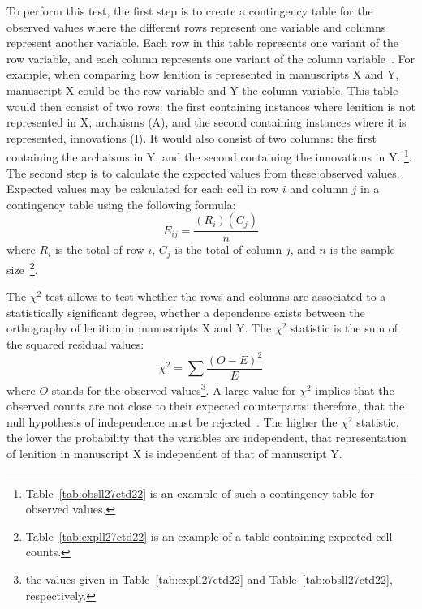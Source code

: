 To perform this test, the  first step is to create a contingency table for the observed values where the different rows represent one variable and columns represent another variable. Each row in this table represents one variant of the row variable, and each column represents one variant of the column variable~\autocite[754]{MS_Statistics09}.
For example, when comparing how lenition is represented in manuscripts X and Y, manuscript X could be the row variable and Y the column variable. This table would then consist of two rows: the first containing instances where lenition is not represented in X, \ie archaisms (A), and the second containing  instances where it is represented, \ie innovations (I).  It would also consist of two columns: the first containing the archaisms in Y, and the second containing the innovations in Y.
\footnote{Table~\ref{tab:obsll27ctd22} is an example of such a contingency table for observed values.}.
The second step is to calculate the expected values from these observed values. Expected values may be calculated for each cell in row \(i\) and column \(j\) in a contingency table using the following formula:
\[E_{ij}=\frac{(R_i)(C_j)}{n}\]
where \(R_i\) is the total of row \(i\), \(C_j\) is the total of column \(j\), and \(n\) is the sample size~\autocite[755--756]{MS_Statistics09}\footnote{ Table~\ref{tab:expll27ctd22} is an example of a table containing expected cell counts.}.

The \(\chi^2\) test allows to test whether the rows and columns are associated to a statistically significant degree, \ie whether a dependence exists between the orthography of lenition in manuscripts X and Y. The \(\chi^2\) statistic is the sum of the squared residual values:
\[\chi^2=\sum{\frac{(O-E)^2}{E}}\]
where \(O\) stands for the observed values\footnote{\eg the values given in Table~\ref{tab:expll27ctd22} and Table~\ref{tab:obsll27ctd22}, respectively.}. A large value for \(\chi^2\) implies that the observed counts are not close to their expected counterparts; therefore, that the null hypothesis of independence must be rejected~\autocite[756--757]{MS_Statistics09}. The higher the \(\chi^2\) statistic, the lower the probability that the variables are independent, \eg that representation of lenition in manuscript X is independent of that of manuscript Y.

